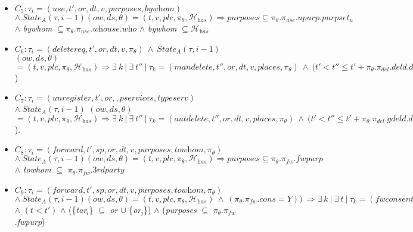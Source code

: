 \documentclass[a4paper]{article}
\begin{document}
\begin{figure}[htbp]
{\begin{minipage}{11.87 cm}
\begin{itemize}
\item $C_5: \tau_i = (\textit{use}, t', \textit{or}, dt, v,   \textit{purposes}, \textit{bywhom})$ $ 
\wedge \ \textit{State}_A(\tau, i-1)(ow, ds, \theta) = (t, v, \textit{plc}, \pi_{\theta}, \mathcal{H}_{\textit{has}}) \Longrightarrow
\textit{purposes} \subseteq \pi_{\theta}.\pi_{use}.upurp.purpset_u$ $\wedge$ \textit{bywhom} $\subseteq \pi_{\theta}.\pi_{use}.\textit{whouse}.\textit{who}$ $\wedge$ \textit{bywhom} $\subseteq \mathcal{H}_{\textit{has}}$\\

\item $C_{6}: \tau_i = (\textit{deletereq}, t', \textit{or}, dt, v, \pi_{\theta}) 
\ \wedge \ \textit{State}_A(\tau, i-1)$
$(ow, ds, \theta)$ $=  (t, v,  \textit{plc}, \pi_{\theta}, \mathcal{H}_{\textit{has}}) \Longrightarrow \exists \ k \ | \ \exists \ t'' \ | \ \tau_k = (\textit{mandelete}, t'', \textit{or}, dt, v, \textit{places}, \pi_{\theta}) \ \wedge \ (t' < t'' \leq t' + \pi_{\theta}.\pi_{del}.deld.dd$)\\

 
\item $C_{7}: \tau_i = (unregister, t', \textit{or}, , \textit{pservices}, \textit{typeserv})$ $ 
\wedge \ \textit{State}_A(\tau, i-1)$
$(ow, ds, \theta)$ $=  (t, v,  \textit{plc}, \pi_{\theta}, \mathcal{H}_{\textit{has}}) \Longrightarrow \exists \ k \ | \ \exists \ t'' \ | \ \tau_k = (\textit{autdelete}, t'', \textit{or}, dt, v, \textit{places}, \pi_{\theta}) 
 \ \wedge \ (t' < t'' \leq t' + \pi_{\theta}.\pi_{del}.\textit{gdeld}.\textit{dcond}$). \\

\item $C_8: \tau_i = (\textit{forward}, t', sp, \textit{or}, dt, v,  \textit{purposes}, \textit{towhom}, \pi_{\theta})$ $ 
\wedge \ \textit{State}_A(\tau, i-1)(ow, ds, \theta) = (t, v, \textit{plc}, \pi_{\theta}, \mathcal{H}_{\textit{has}}) \Longrightarrow
\textit{purposes} \subseteq \pi_{\theta}.\pi_{fw}.\textit{fwpurp}$ $\wedge$ \textit{towhom} $\subseteq$ $\pi_{\theta}.\pi_{fw}.\textit{3rdparty}$\\

\item $C_{9}: \tau_i = (\textit{forward}, t', sp, \textit{or}, dt, v,  \textit{purposes}, \textit{towhom}, \pi_{\theta})$ $ 
\wedge \ \textit{State}_A(\tau, i-1)(ow, ds, \theta) = (t, v, \textit{plc}, \pi_{\theta}, \mathcal{H}_{\textit{has}})\ \wedge \ (\pi_{\theta}.\pi_{fw}.\textit{cons} = \textit{Y})) \ \Longrightarrow
\exists \ k \ | \ \exists \ t \ | \ \tau_k =  (\textit{fwconsent}, t, \{\textit{tar}_i\}, dt, v,  \textit{purposes}, \pi_{\theta})$ $\wedge$ $(t < t')$   $\wedge$ (\{\textit{tar}$_i$\} $\subseteq$ \textit{or} $\cup$ \{\textit{or}$_j$\}) $\wedge$ (\textit{purposes} $\subseteq$ $\pi_{\theta}$.$\pi_{fw}$.\textit{fwpurp})\\


\end{itemize}
\end{minipage}}
\end{figure}
\end{document}
